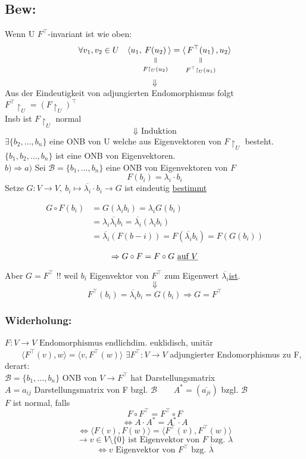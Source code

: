 \documentclass[titlepage,12pt,a4paper,ngerman]{report}
\newcommand{\verteq}{\rotatebox{90}{$\,=$}}
\newcommand{\equalto}[2]{\underset{\scriptstyle\overset{\mkern4mu\verteq}{#2}}{#1}}
\newcommand{\tx}[1]{\textrm{#1}}
\newcommand{\basis}[3]{\{#1_{#2}, \dots, #1_{#3}\}}
\newcommand{\ska}[2]{\langle #1 , #2 \rangle}
\newcommand{\enph}{F: V \to V \textrm{ Endomorphismus}}
\begin{document}
\subsection{Bew:}
Wenn U $ F^\top $-invariant ist wie oben:\\
$$ \forall v_1,v_2 \in U \quad \langle u_1,\equalto{F(u_2)}{F\upharpoonright_U(u_2)} \rangle = \langle \equalto{F^\top(u_1)}{F^\top\upharpoonright_U(u_1)} , u_2 \rangle $$
$$\Downarrow$$
Aus der Eindeutigkeit von adjungierten Endomorphismus  folgt\\
$ F^\top \upharpoonright_U = (F\upharpoonright_U)^\top $\\
Insb ist $ F\upharpoonright_U $ normal 
$$\Downarrow \tx{ Induktion}$$
$ \exists \basis{b}{2}{n} $ eine ONB von U welche aus Eigenvektoren von $ F\upharpoonright _U $ besteht.\\
$ \{ b_1, b_2 , \dots , b_n \} $ ist eine ONB von Eigenvektoren.\\
$\boxed{b) \Rightarrow a)}$ Sei $\mathcal B = \basis{b}{1}{n}$ eine ONB von Eigenvektoren von $F$
$$F(b_i) = \lambda_i \cdot b_i$$
Setze $G: V \to V,\ b_i \mapsto \overline{\lambda_i}\cdot b_i\rightarrow G$ ist eindeutig \underline{bestimmt}

\begin{align*}
G \circ F ( b_i) &= G(\lambda_i b_i) = \lambda_i G (b_i)\\
&= \lambda_i \overline{\lambda_i} b_i = \overline{\lambda_i} (\lambda_i b_i)\\
&= \overline{\lambda_i}(F(b-i)) = F(\overline{\lambda_i}b_i) = F(G(b_i))
\end{align*}

$$\Rightarrow G \circ F = F \circ G \tx{ \underline{auf $V$}}$$

Aber $ G = F^\top $ !! weil $ b_i $ Eigenvektor von $ F^\top $ zum Eigenwert $ \overline{\lambda_i} $\underline{ist}.
$$ \Downarrow $$
$$F^\top(b_i) = \overline{\lambda_i} b_i = G(b_i) \Rightarrow G = F^\top$$ 


\subsubsection{Widerholung:}
$ \enph $ endlichdim. euklidisch, unitär$ \qquad \ska{F^\top(v)}{w} = \ska{v}{F^\top(w)} $
$ \exists F^\top: V \to V $ adjungierter Endomorphismus zu F, derart:\\
$ \mathcal{B} = \basis{b}{1}{n} $ ONB von $ V \to F^\top $ hat Darstellungsmatrix \\
$ A = a_{ij} $ Darstellungsmatrix von F bzgl. $ \mathcal{B} \qquad A^* = (\overline{a_{ji}})$ bzgl. $\mathcal{B}$\\
$F$ ist normal, falls $$F \circ F^\top = F^\top \circ F$$
$$\Leftrightarrow A \cdot A^* = A^* \cdot A$$
$$\Leftrightarrow \ska{F(v)}{F(w)} = \ska{F^\top (v)}{F^\top (w)}$$
$$\longrightarrow v \in V \setminus \{0\} \tx{ ist Eigenvektor von $F$ bzg. } \lambda $$
$$\Leftrightarrow v \tx{ Eigenvektor von } F^\top \tx{ bzg. } \overline{\lambda}$$
\end{document}
